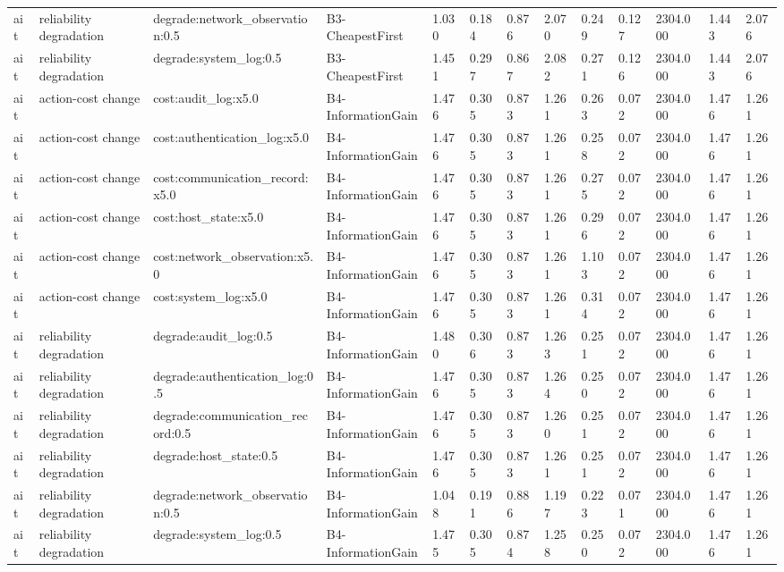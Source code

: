 \begin{table}[!ht]
{\begin{tabular}{lllllllllllll}
ait & reliability degradation & degrade:network\_observation:0.5 & B3-CheapestFirst & 1.030 & 0.184 & 0.876 & 2.070 & 0.249 & 0.127 & 2304.000 & 1.443 & 2.076 \\
ait & reliability degradation & degrade:system\_log:0.5 & B3-CheapestFirst & 1.451 & 0.297 & 0.867 & 2.082 & 0.271 & 0.126 & 2304.000 & 1.443 & 2.076 \\
ait & action-cost change & cost:audit\_log:x5.0 & B4-InformationGain & 1.476 & 0.305 & 0.873 & 1.261 & 0.263 & 0.072 & 2304.000 & 1.476 & 1.261 \\
ait & action-cost change & cost:authentication\_log:x5.0 & B4-InformationGain & 1.476 & 0.305 & 0.873 & 1.261 & 0.258 & 0.072 & 2304.000 & 1.476 & 1.261 \\
ait & action-cost change & cost:communication\_record:x5.0 & B4-InformationGain & 1.476 & 0.305 & 0.873 & 1.261 & 0.275 & 0.072 & 2304.000 & 1.476 & 1.261 \\
ait & action-cost change & cost:host\_state:x5.0 & B4-InformationGain & 1.476 & 0.305 & 0.873 & 1.261 & 0.296 & 0.072 & 2304.000 & 1.476 & 1.261 \\
ait & action-cost change & cost:network\_observation:x5.0 & B4-InformationGain & 1.476 & 0.305 & 0.873 & 1.261 & 1.103 & 0.072 & 2304.000 & 1.476 & 1.261 \\
ait & action-cost change & cost:system\_log:x5.0 & B4-InformationGain & 1.476 & 0.305 & 0.873 & 1.261 & 0.314 & 0.072 & 2304.000 & 1.476 & 1.261 \\
ait & reliability degradation & degrade:audit\_log:0.5 & B4-InformationGain & 1.480 & 0.306 & 0.873 & 1.263 & 0.251 & 0.072 & 2304.000 & 1.476 & 1.261 \\
ait & reliability degradation & degrade:authentication\_log:0.5 & B4-InformationGain & 1.476 & 0.305 & 0.873 & 1.264 & 0.250 & 0.072 & 2304.000 & 1.476 & 1.261 \\
ait & reliability degradation & degrade:communication\_record:0.5 & B4-InformationGain & 1.476 & 0.305 & 0.873 & 1.260 & 0.251 & 0.072 & 2304.000 & 1.476 & 1.261 \\
ait & reliability degradation & degrade:host\_state:0.5 & B4-InformationGain & 1.476 & 0.305 & 0.873 & 1.261 & 0.251 & 0.072 & 2304.000 & 1.476 & 1.261 \\
ait & reliability degradation & degrade:network\_observation:0.5 & B4-InformationGain & 1.048 & 0.191 & 0.886 & 1.197 & 0.223 & 0.071 & 2304.000 & 1.476 & 1.261 \\
ait & reliability degradation & degrade:system\_log:0.5 & B4-InformationGain & 1.475 & 0.305 & 0.874 & 1.258 & 0.250 & 0.072 & 2304.000 & 1.476 & 1.261 \\

\end{tabular}}
\end{table}
